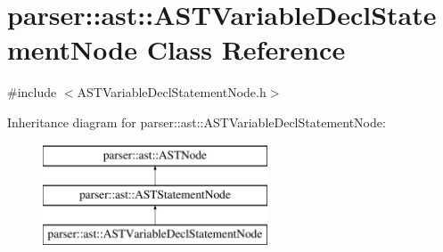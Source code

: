 \hypertarget{classparser_1_1ast_1_1ASTVariableDeclStatementNode}{}\section{parser\+:\+:ast\+:\+:A\+S\+T\+Variable\+Decl\+Statement\+Node Class Reference}
\label{classparser_1_1ast_1_1ASTVariableDeclStatementNode}


{\ttfamily \#include $<$A\+S\+T\+Variable\+Decl\+Statement\+Node.\+h$>$}

Inheritance diagram for parser\+:\+:ast\+:\+:A\+S\+T\+Variable\+Decl\+Statement\+Node\+:\begin{figure}[H]
\begin{center}
\leavevmode
\includegraphics[height=3.000000cm]{d6/d12/classparser_1_1ast_1_1ASTVariableDeclStatementNode}
\end{center}
\end{figure}
